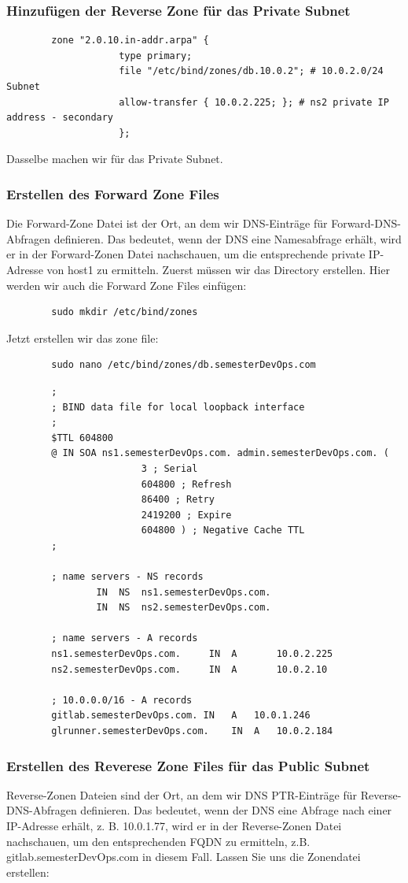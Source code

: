 \documentclass[a4paper,12pt]{article}
\begin{document}
\subsubsection{Hinzufügen der Reverse Zone für das Private Subnet}
\begin{verbatim}
		zone "2.0.10.in-addr.arpa" {
					type primary;
					file "/etc/bind/zones/db.10.0.2"; # 10.0.2.0/24 Subnet
					allow-transfer { 10.0.2.225; }; # ns2 private IP address - secondary
					};
\end{verbatim}
Dasselbe machen wir für das Private Subnet.

\subsubsection{Erstellen des Forward Zone Files}
Die Forward-Zone Datei ist der Ort, an dem wir DNS-Einträge für Forward-DNS-Abfragen definieren. 
Das bedeutet, wenn der DNS eine Namesabfrage erhält, wird er in der Forward-Zonen Datei nachschauen, um die entsprechende private IP-Adresse von host1 zu ermitteln.
Zuerst müssen wir das Directory erstellen. Hier werden wir auch die Forward Zone Files einfügen:
\begin{verbatim}
		sudo mkdir /etc/bind/zones
\end{verbatim}
Jetzt erstellen wir das zone file:
\begin{verbatim}
		sudo nano /etc/bind/zones/db.semesterDevOps.com
\end{verbatim}

\begin{verbatim}
		;
		; BIND data file for local loopback interface
		;
		$TTL 604800
		@ IN SOA ns1.semesterDevOps.com. admin.semesterDevOps.com. (
						3 ; Serial
						604800 ; Refresh
						86400 ; Retry
						2419200 ; Expire
						604800 ) ; Negative Cache TTL
		;

		; name servers - NS records
				IN	NS 	ns1.semesterDevOps.com.
				IN 	NS 	ns2.semesterDevOps.com.

		; name servers - A records
		ns1.semesterDevOps.com. 	IN	A		10.0.2.225
		ns2.semesterDevOps.com. 	IN	A		10.0.2.10

		; 10.0.0.0/16 - A records
		gitlab.semesterDevOps.com. IN 	A 	10.0.1.246
		glrunner.semesterDevOps.com. 	IN 	A 	10.0.2.184
\end{verbatim}


\subsubsection{Erstellen des Reverese Zone Files für das Public Subnet}
Reverse-Zonen Dateien sind der Ort, an dem wir DNS PTR-Einträge für Reverse-DNS-Abfragen definieren. 
Das bedeutet, wenn der DNS eine Abfrage nach einer IP-Adresse erhält, z. B. 10.0.1.77, wird er in der Reverse-Zonen Datei nachschauen, um den entsprechenden FQDN zu ermitteln, z.B. gitlab.semesterDevOps.com in diesem Fall.
Lassen Sie uns die Zonendatei erstellen:
\end{document}
